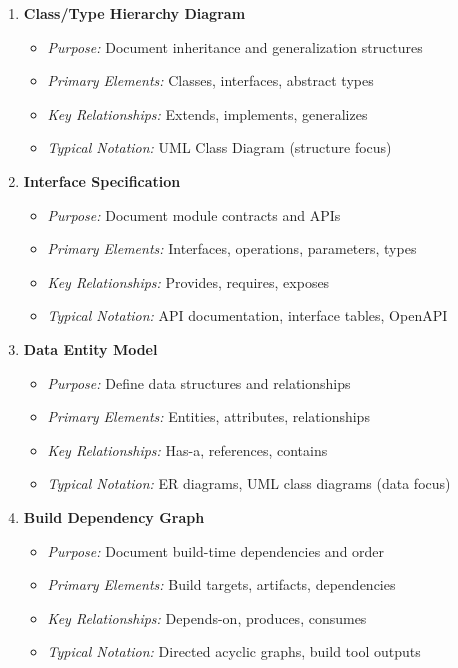 \documentclass[11pt,letterpaper]{article}
\begin{document}
\begin{enumerate}[label=\textbf{MT\arabic*:}, leftmargin=2.5em]
    \item \textbf{Class/Type Hierarchy Diagram}
    \begin{itemize}[nosep]
        \item \textit{Purpose:} Document inheritance and generalization structures
        \item \textit{Primary Elements:} Classes, interfaces, abstract types
        \item \textit{Key Relationships:} Extends, implements, generalizes
        \item \textit{Typical Notation:} UML Class Diagram (structure focus)
    \end{itemize}
    
    \item \textbf{Interface Specification}
    \begin{itemize}[nosep]
        \item \textit{Purpose:} Document module contracts and APIs
        \item \textit{Primary Elements:} Interfaces, operations, parameters, types
        \item \textit{Key Relationships:} Provides, requires, exposes
        \item \textit{Typical Notation:} API documentation, interface tables, OpenAPI
    \end{itemize}
    
    \item \textbf{Data Entity Model}
    \begin{itemize}[nosep]
        \item \textit{Purpose:} Define data structures and relationships
        \item \textit{Primary Elements:} Entities, attributes, relationships
        \item \textit{Key Relationships:} Has-a, references, contains
        \item \textit{Typical Notation:} ER diagrams, UML class diagrams (data focus)
    \end{itemize}
    
    \item \textbf{Build Dependency Graph}
    \begin{itemize}[nosep]
        \item \textit{Purpose:} Document build-time dependencies and order
        \item \textit{Primary Elements:} Build targets, artifacts, dependencies
        \item \textit{Key Relationships:} Depends-on, produces, consumes
        \item \textit{Typical Notation:} Directed acyclic graphs, build tool outputs
    \end{itemize}
    

\end{enumerate}
\end{document}
